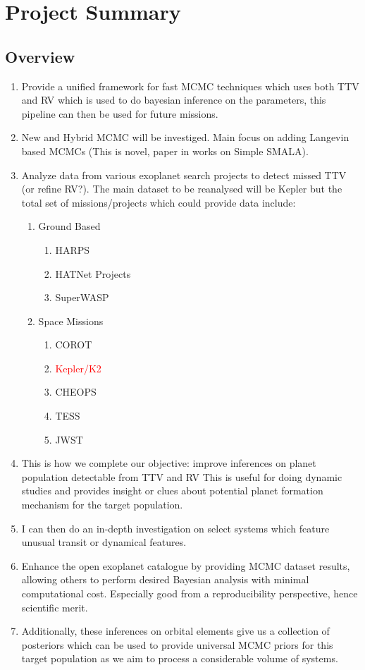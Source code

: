 \section{Project Summary}
\subsection{Overview} 
\begin{enumerate}
  \item Provide a unified framework for fast MCMC techniques which uses both TTV and RV which is used to do bayesian inference on the parameters, this pipeline can then be used for future missions.
  \item New and Hybrid MCMC will be investiged. Main focus on adding Langevin based MCMCs (This is novel, paper in works on Simple SMALA).
  \item Analyze data from various exoplanet search projects to detect missed TTV (or refine RV?). The main dataset to be reanalysed will be Kepler but the total set of missions/projects which could provide data include: 
      \begin{enumerate}
      \item Ground Based
      		\begin{enumerate}
      		\item HARPS
      		\item HATNet Projects
      		\item SuperWASP
      		\end{enumerate}
      \item Space Missions
      		\begin{enumerate}
            \item COROT
      		\item \textcolor{red}{Kepler/K2}
           	\item CHEOPS
      		\item TESS
            \item JWST
      		\end{enumerate}
      \end{enumerate}
  \item This is how we complete our objective: improve inferences on planet population detectable from TTV and RV This is useful for doing dynamic studies and provides insight or clues about potential planet formation mechanism for the target population.
  \item I can then do an in-depth investigation on select systems which feature unusual transit or dynamical features.
  \item Enhance the open exoplanet catalogue by providing MCMC dataset results, allowing others to perform desired Bayesian analysis with minimal computational cost. Especially good from a reproducibility perspective, hence scientific merit.
  \item Additionally, these inferences on orbital elements give us a collection of posteriors which can be used to provide universal MCMC priors for this target population as we aim to process a considerable volume of systems.
\end{enumerate}


